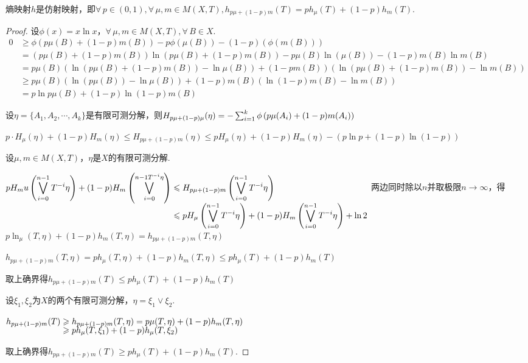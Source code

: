 \begin{theorem}{}
    熵映射$h$是仿射映射，即$\forall\,p\in(0,1),\forall\,\mu,m\in M(X,T),h_{p\mu+(1-p)m}(T)=ph_\mu(T)+(1-p)h_m(T)$.
\end{theorem}
\begin{proof}
    设$\phi(x)=x\ln{x}$，$\forall\,\mu,m\in M(X,T),\forall\,B\in X$.
    {\setjot[-2]\begin{align*}
        0&\geq \phi(p\mu(B)+(1-p)m(B))-p\phi(\mu(B))-(1-p)\left(\phi(m(B))\right) \\
        &=\left(p\mu(B)+(1-p)m(B)\right)\ln\left(p\mu(B)+(1-p)m(B)\right)-p\mu(B)\ln\left(\mu(B)\right)-(1-p)m(B)\ln m(B) \\
        &=p\mu(B)\left(\ln\left(p\mu(B)+(1-p)m(B)\right)-\ln\mu(B)\right)+(1-pm(B))\left(\ln\left(p\mu(B)+(1-p)m(B)\right)-\ln m(B)\right) \\
        &\geq p\mu(B)\left(\ln(p\mu(B))-\ln\mu(B)\right)+(1-p)m(B)\left(\ln(1-p)m(B)-\ln m(B)\right) \\
        &=p\ln{p}\mu(B)+(1-p)\ln{(1-p)}m(B)
    \end{align*}}\par
    \vspace{-1 em}
    设$\eta=\{A_1,A_2,\cdots,A_k\}$是有限可测分解，则$H_{p\mu+(1-p)\mu}(\eta)=-\sum_{i=1}^{k}\phi\left(p\mu(A_i)+(1-p)m(A_i)\right)$\par
    $p\cdot H_\mu(\eta)+(1-p)H_m(\eta)\leq H_{p\mu+(1-p)m}(\eta)\leq pH_\mu(\eta)+(1-p)H_m(\eta)-\left(p\ln{p}+(1-p)\ln{(1-p)}\right)$\par
    设$\mu,m\in M(X,T)$，$\eta$是$X$的有限可测分解.\par
    $\setjot[-2]\begin{aligned}[t]
        pH_mu\left(\bigvee_{i=0}^{n-1}T^{-i}\eta\right)+(1-p)H_m\left(\bigvee_{i=0}^{n-1T^{-i}\eta}\right)&\leq H_{p\mu+(1-p)m}\left(\bigvee_{i=0}^{n-1}T^{-i}\eta\right) \\
        &\leq pH_\mu\left(\bigvee_{i=0}^{n-1}T^{-i}\eta\right)+(1-p)H_m\left(\bigvee_{i=0}^{n-1}T^{-i}\eta\right)+\ln{2}
    \end{aligned}$
    两边同时除以$n$并取极限$n\to\infty$，得$p\ln_\mu(T,\eta)+(1-p)h_m(T,\eta)=h_{p\mu+(1-p)m}(T,\eta)$\par
    $h_{p\mu+(1-p)m}(T,\eta)=ph_\mu(T,\eta)+(1-p)h_m(T,\eta)\leq ph_\mu(T)+(1-p)h_m(T)$\par
    取上确界得$h_{p\mu+(1-p)m}(T)\leq ph_\mu(T)+(1-p)h_m(T)$\par
    设$\xi_1,\xi_2$为$X$的两个有限可测分解，$\eta=\xi_1\vee\xi_2$.\par
    $\setjot[-2]\begin{aligned}[t]
        h_{p\mu+(1-p)m}(T)&\geq h_{p\mu+(1-p)m}(T,\eta)=p\mu(T,\eta)+(1-p)h_m(T,\eta) \\
        &\geq ph_\mu(T,\xi_1)+(1-p)h_\mu(T,\xi_2)
    \end{aligned}$\par
    取上确界得$h_{p\mu+(1-p)m}(T)\geq ph_\mu(T)+(1-p)h_m(T)$.
\end{proof}


